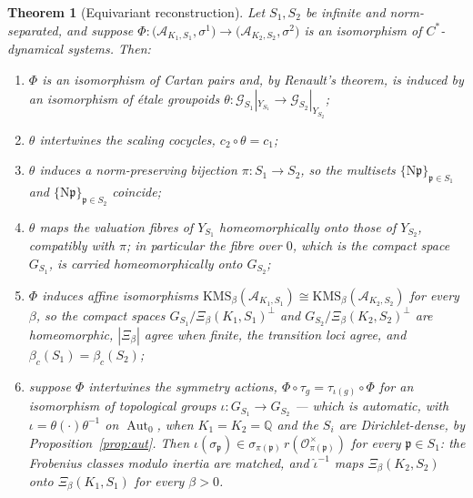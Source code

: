 \documentclass[11pt]{amsart}
\numberwithin{equation}{section}
\newtheorem{theorem}{Theorem}[section]
\theoremstyle{definition}
\theoremstyle{remark}
\newcommand{\Q}{\mathbb{Q}}
\newcommand{\cA}{\mathcal{A}}
\newcommand{\cG}{\mathcal{G}}
\newcommand{\cO}{\mathcal{O}}
\newcommand{\pp}{\mathfrak{p}}
\newcommand{\Ns}{\mathrm{N}}
\begin{document}
\begin{theorem}[Equivariant reconstruction]\label{thm:rec}
Let $S_1,S_2$ be infinite and norm-separated, and suppose
$\Phi:\bigl(\cA_{K_1,S_1},\sigma^1\bigr)\to\bigl(\cA_{K_2,S_2},\sigma^2\bigr)$ is an
isomorphism of $C^*$-dynamical systems. Then:
\begin{enumerate}
\item $\Phi$ is an isomorphism of Cartan pairs and, by Renault's theorem, is induced by an
isomorphism of \'etale groupoids $\theta:\cG_{S_1}|_{Y_{S_1}}\to\cG_{S_2}|_{Y_{S_2}}$;
\item $\theta$ intertwines the scaling cocycles, $c_2\circ\theta=c_1$;
\item $\theta$ induces a norm-preserving bijection $\pi:S_1\to S_2$, so the multisets
$\{\Ns\pp\}_{\pp\in S_1}$ and $\{\Ns\pp\}_{\pp\in S_2}$ coincide;
\item $\theta$ maps the valuation fibres of $Y_{S_1}$ homeomorphically onto those of
$Y_{S_2}$, compatibly with $\pi$; in particular the fibre over $0$, which is the compact
space $G_{S_1}$, is carried homeomorphically onto $G_{S_2}$;
\item $\Phi$ induces affine isomorphisms $\mathrm{KMS}_\beta(\cA_{K_1,S_1})\cong\mathrm{KMS}_\beta(\cA_{K_2,S_2})$
for every $\beta$, so the compact spaces $G_{S_1}/\Xi_\beta(K_1,S_1)^\perp$ and
$G_{S_2}/\Xi_\beta(K_2,S_2)^\perp$ are homeomorphic, $|\Xi_\beta|$ agree when finite, the
transition loci agree, and $\beta_c(S_1)=\beta_c(S_2)$;
\item suppose $\Phi$ intertwines the symmetry actions, $\Phi\circ\tau_g=\tau_{\iota(g)}\circ\Phi$
for an isomorphism of topological groups $\iota:G_{S_1}\to G_{S_2}$ --- which is automatic,
with $\iota=\theta(\cdot)\theta^{-1}$ on $\operatorname{Aut}_0$, when $K_1=K_2=\Q$ and the
$S_i$ are Dirichlet-dense, by Proposition~\ref{prop:aut}. Then
$\iota(\sigma_\pp)\in\sigma_{\pi(\pp)}\,r(\cO_{\pi(\pp)}^\times)$ for every $\pp\in S_1$: the
Frobenius classes modulo inertia are matched, and $\hat\iota^{-1}$ maps
$\Xi_\beta(K_2,S_2)$ onto $\Xi_\beta(K_1,S_1)$ for every $\beta>0$.
\end{enumerate}
\end{theorem}
\end{document}
